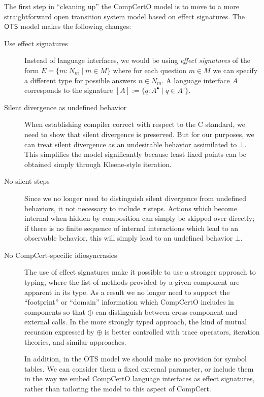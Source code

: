 \documentclass{report}
\begin{document}
The first step in ``cleaning up'' the CompCertO model
is to move to a more straightforward open transition system model
based on effect signatures.
The $\mathsf{OTS}$ model makes the following changes:
\begin{description}
\item[Use effect signatures]
  Instead of language interfaces,
  we would be using
  \emph{effect signatures} of the form $E = \{ m : N_m \mid m \in M \}$
  where for each question $m \in M$
  we can specify a different type for possible answers $n \in N_m$.
  A language interface $A$ corresponds to the signature
  $[A] := \{ q : A^\bullet \mid q \in A^\circ \}$.

\item[Silent divergence as undefined behavior]
  When establishing compiler correct with respect to the C standard,
  we need to show that silent divergence is preserved.
  But for our purposes,
  we can treat silent divergence as an undesirable behavior
  assimilated to $\bot$.
  This simplifies the model significantly
  because least fixed points can be obtained simply through
  Kleene-style iteration.

\item[No silent steps]
  Since we no longer need
  to distinguish silent divergence from undefined behaviors,
  it not necessary to include $\tau$ steps.
  Actions which become internal when hidden by composition
  can simply be skipped over directly;
  if there is no finite sequence of internal interactions
  which lead to an observable behavior,
  this will simply lead to an undefined behavior $\bot$.

\item[No CompCert-specific idiosyncrasies]
  The use of effect signatures make it possible to use
  a stronger approach to typing,
  where the list of methods provided by a given component
  are apparent in its type.
  As a result we no longer need to support
  the ``footprint'' or ``domain'' information
  which CompCertO includes in components so that $\oplus$
  can distinguish between cross-component and external calls.
  In the more strongly typed approach,
  the kind of mutual recursion expressed by $\oplus$
  is better controlled with trace operators, iteration theories,
  and similar approaches.

  In addition,
  in the OTS model we should make no provision for symbol tables.
  We can consider them a fixed external parameter,
  or include them in the way we embed CompCertO language interfaces
  as effect signatures,
  rather than tailoring the model to this aspect of CompCert.
\end{description}
\end{document}
